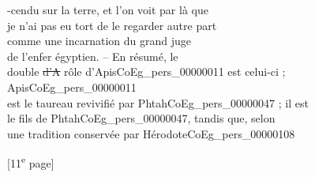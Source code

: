 \documentclass{book}
\begin{document}
{\begin{paracol}{2}
-cendu sur la terre, et l’on voit par là que\\
je n’ai pas eu tort de le regarder autre part\\
comme une incarnation du grand juge\\
de l’enfer égyptien. – En résumé, le\\
double \sout{d’A} rôle d’Apis\gls{CoEg_pers_00000011} est celui-ci ; Apis\gls{CoEg_pers_00000011}\\
est le taureau revivifié par Phtah\gls{CoEg_pers_00000047} ; il est\\
le fils de Phtah\gls{CoEg_pers_00000047}, tandis que, selon\\
une tradition conservée par Hérodote\gls{CoEg_pers_00000108}
\end{paracol}

{\footnotesize\begin{center} {[11\textsuperscript{e} page]}\end{center}}

}
\end{document}
